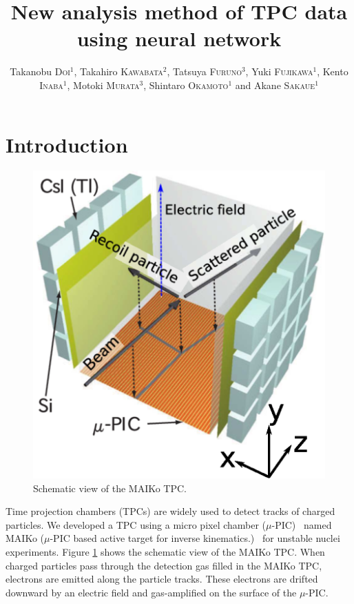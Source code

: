 \documentclass{jps-cp}
\title{New analysis method of TPC data using neural network}
\author{
  Takanobu \textsc{Doi}$^{1}$, Takahiro \textsc{Kawabata}$^{2}$, Tatsuya \textsc{Furuno}$^{3}$,
  Yuki \textsc{Fujikawa}$^{1}$, Kento \textsc{Inaba}$^{1}$, Motoki \textsc{Murata}$^{3}$,
  Shintaro \textsc{Okamoto}$^{1}$ and Akane \textsc{Sakaue}$^{1}$}
\begin{document}
\maketitle

\section{Introduction}
\begin{figure}
  \vspace{0zw}
  \centering
  \includegraphics[clip, width=15zw]{eps/MAIKo.eps}
  \caption{Schematic view of the MAIKo TPC.}
  \label{fig:MAIKo}
  \vspace{-2zw}
\end{figure}
Time projection chambers (TPCs) are widely used to detect tracks of charged particles.
We developed a TPC using a micro pixel chamber ($\mu$-PIC)~\cite{mupic} named
MAIKo ($\mu$-PIC based active target for inverse kinematics.)~\cite{MAIKo}
for unstable nuclei experiments.
Figure \ref{fig:MAIKo} shows the schematic view of the MAIKo TPC.
When charged particles pass through the detection gas filled in the MAIKo TPC,
electrons are emitted along the particle tracks.
These electrons are drifted downward by an electric field and
gas-amplified on the surface of the $\mu$-PIC.
\end{document}
